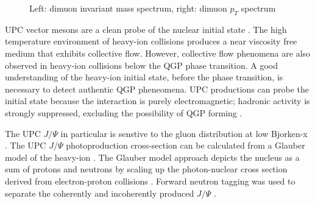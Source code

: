 \begin{figure}%
    \centering
    \qquad
    \caption{Left: dimuon invariant mass spectrum, right: dimuon $p_T$ spectrum \cite{Khachatryan:2016qhq}}%
    \label{fig:patKennyPlots}%
\end{figure}

UPC vector mesons are a clean probe of the nuclear initial state \cite{Aktas:2006qs}\cite{oniaPol}. The high temperature environment of heavy-ion collisions produces a near viscosity free medium that exhibits collective flow. However, collective flow phenomena are also observed in heavy-ion collisions below the QGP phase transition. A good understanding of the heavy-ion initial state, before the phase transition, is necessary to detect authentic QGP pheneomena. UPC productions can probe the initial state because the interaction is purely electromagnetic; hadronic activity is strongly suppressed, excluding the possibility of QGP forming \cite{vmd1999}\cite{vmd2000.03}. 

The UPC $J/\Psi$ in particular is senstive to the gluon distribution at low Bjorken-x \cite{Teubner:2005sj}. The UPC $J/\Psi$ photoproduction cross-section can be calculated from a Glauber model of the heavy-ion \cite{Brodsky:1994kf}. The Glauber model approach depicts the nucleus as a sum of protons and neutrons by scaling up the photon-nuclear cross section derived from electron-proton collisions \cite{Miller:2007ri}. Forward neutron tagging was used to separate the coherently and incoherently produced $J/\Psi$ \cite{Guzey:2013jaa} \cite{Strikman:2005ze} \cite{lta2012.03}\cite{emPcite4}\cite{emPCite5}\cite{emPCite6}\cite{upcNeuPHENIX}.

